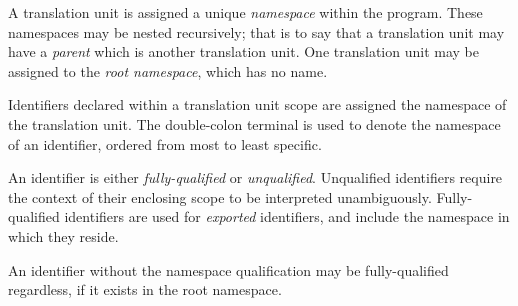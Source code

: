 \specsubsubitem
A translation unit is assigned a unique \textit{namespace} within the program.
These namespaces may be nested recursively; that is to say that a translation
unit may have a \textit{parent} which is another translation unit. One
translation unit may be assigned to the \textit{root namespace}, which has no
name.

\specsubsubitem
Identifiers declared within a translation unit scope are assigned the namespace
of the translation unit. The double-colon terminal \terminal{::} is used to
denote the namespace of an identifier, ordered from most to least specific.

\specsubsubitem
An identifier is either \textit{fully-qualified} or \textit{unqualified}.
Unqualified identifiers require the context of their enclosing scope to be
interpreted unambiguously. Fully-qualified identifiers are used for
\textit{exported} identifiers, and include the namespace in which they reside.


\specsubsubitem
An identifier without the namespace qualification may be fully-qualified
regardless, if it exists in the root namespace.
